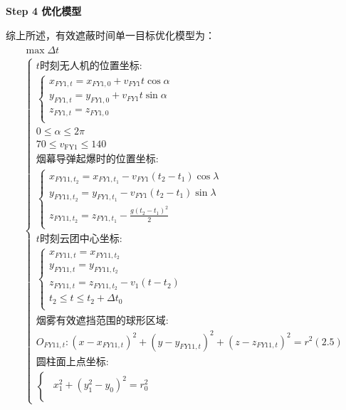 \documentclass[../main.tex]{subfiles}
\begin{document}
\textbf{Step 4 优化模型}
\par 综上所述，有效遮蔽时间单一目标优化模型为：
\begin{align}
  \begin{array}{c}
	\max \Delta t
  \\
\left\{ \begin{array}{l}
	t\text{时刻无人机的位置坐标:}\\
	\left\{ \begin{array}{l}
	x_{FY1,t}=x_{FY1,0}+v_{FY1}t\cos \alpha \\
	y_{FY1,t}=y_{FY1,0}+v_{FY1}t\sin \alpha \\
	z_{FY1,t}=z_{FY1,0}\\
\end{array} \right.\\
	0\leq \alpha \leq 2\pi \\
  70 \leq v_{\text{FY1}} \leq 140\\
	\text{烟幕导弹起爆时的位置坐标:}\\
	\left\{ \begin{array}{l}
	x_{FY11,t_2}=x_{FY1,t_1}-v_{FY1}\left( t_2-t_1 \right) \cos \lambda\\
	y_{FY11,t_2}=y_{FY1,t_1}-v_{FY1}\left( t_2-t_1 \right) \sin \lambda\\
	z_{FY11,t_2}=z_{FY1,t_1}-\frac{g\left( t_2-t_1 \right) ^2}{2}\\
\end{array} \right.\\
	t\text{时刻云团中心坐标:}\\
	\left\{ \begin{array}{l}
	x_{FY11,t}=x_{FY11,t_2}\\
	y_{FY11,t}=y_{FY11,t_2}\\
	z_{FY11,t}=z_{FY11,t_2}-v_1\left( t-t_2 \right)\\
	t_2\leq t\leq t_2+\Delta t_0\\
\end{array} \right.\\
	\text{烟雾有效遮挡范围的球形区域:}\\
	O_{FY11,t}:\left( x-x_{FY11,t} \right) ^2+\left( y-y_{FY11,t} \right) ^2+\left( z-z_{FY11,t} \right) ^2=r^2\left( 2.5 \right)\\
	\text{圆柱面上点坐标:}\\
	\left\{ \begin{array}{c}
	\begin{array}{l}
	x_{1}^{2}+\left( y_{1}^{2}-y_0 \right) ^2=r_{0}^{2}\\

\end{array}
\end{array}
\end{array}
\end{array}
\end{align}
\end{document}
